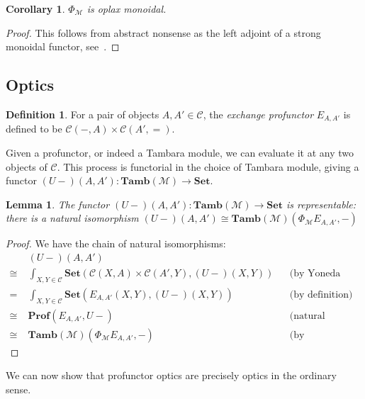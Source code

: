 \documentclass[11pt,letterpaper]{article}
\theoremstyle{plain}
\newtheorem{lemma}[theorem]{Lemma}
\newtheorem{corollary}[theorem]{Corollary}
\theoremstyle{definition}
\newtheorem{definition}[theorem]{Definition}
\newcommand{\C}{\mathscr{C}}
\newcommand{\M}{\mathscr{M}}
\newcommand{\Pastro}{\Phi}
\newcommand{\Set}{\mathbf{Set}}
\newcommand{\Prof}{\mathbf{Prof}}
\newcommand{\Tamb}{\mathbf{Tamb}}
\begin{document}
\begin{corollary}
  $\Pastro_\M$ is oplax monoidal.
\end{corollary}
\begin{proof}
  This follows from abstract nonsense as the left adjoint of a strong monoidal functor, see~\cite{Kelly1974}.
\end{proof}

\subsection{Optics}
\begin{definition}
  For a pair of objects $A, A' \in \C$, the \emph{exchange profunctor} $E_{A, A'}$ is defined to be $\C(-, A) \times \C(A', {=})$.
\end{definition}

Given a profunctor, or indeed a Tambara module, we can evaluate it at any two objects of $\C$. This process is functorial in the choice of Tambara module, giving a functor $(U-)(A,A') : \Tamb(\M) \to \Set$.

\begin{lemma}\label{lemma-rep}
  The functor $(U-)(A,A') : \Tamb(\M) \to \Set$ is representable: there is a natural isomorphism
  $(U-)(A,A') \cong \Tamb(\M)(\Pastro_\M E_{A, A'}, -)$
\end{lemma}
\begin{proof}
  We have the chain of natural isomorphisms:
  \begin{align*}
    &(U-)(A,A') \\
    \cong \;&\int_{X,Y \in \C} \Set(\C(X,A) \times \C(A',Y), (U-)(X,Y)) && \text{(by Yoneda reduction twice)} \\
    =\;&\int_{X,Y \in \C} \Set(E_{A, A'}(X,Y), (U-)(X,Y)) && \text{(by definition)}\\
    \cong \;&\Prof(E_{A, A'}, U-) && \text{(natural transformations as ends)} \\
    \cong \;&\Tamb(\M)(\Pastro_\M E_{A, A'}, -) && \text{(by adjointness)}
  \end{align*}
\end{proof}

We can now show that profunctor optics are precisely optics in the ordinary sense.
\end{document}
